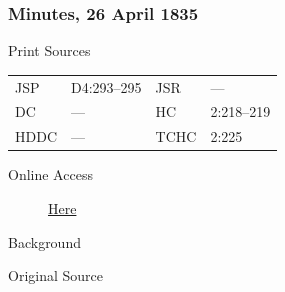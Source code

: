 		\subsubsection{Minutes, 26 April 1835}
			\label{EMS-1835-JS-26-APR-1835}
			
			\begin{description}
				\item[Print Sources]
			\end{description}

				\begin{tabular}{p{0.5in}p{1in}p{0.5in}p{1in}}
				JSP	 	& D4:293--295		& JSR 		& --- \\
				DC	 	& --- 				& HC 		& 2:218--219 \\
				HDDC 	& ---				& TCHC 		& 2:225 \\
				\end{tabular}
			
			\begin{description}
				\item[Online Access] \href{https://www.josephsmithpapers.org/paper-summary/minutes-26-april-1835/1}{Here}
			\end{description}
			
			\begin{description}
				\item[Background]
			\end{description}
			
			
			\begin{description}
				\item[Original Source]
			\end{description}
			
			
